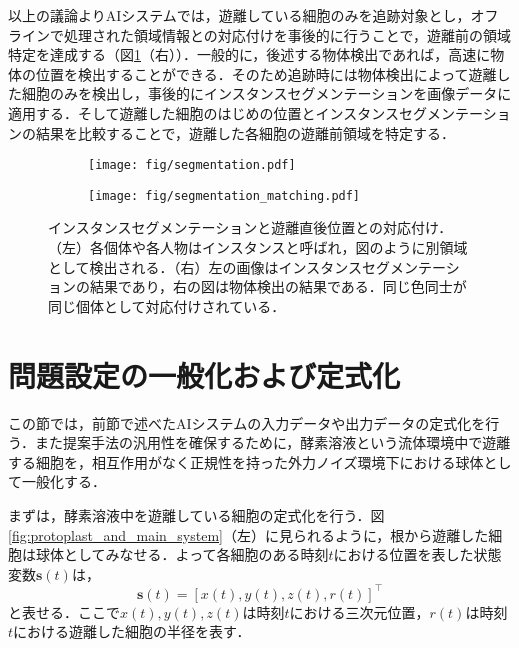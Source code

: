     以上の議論よりAIシステムでは，遊離している細胞のみを追跡対象とし，オフラインで処理された領域情報との対応付けを事後的に行うことで，遊離前の領域特定を達成する（図\ref{fig:instance_segmentation_and_matching}（右））．一般的に，後述する物体検出であれば，高速に物体の位置を検出することができる．そのため追跡時には物体検出によって遊離した細胞のみを検出し，事後的にインスタンスセグメンテーションを画像データに適用する．そして遊離した細胞のはじめの位置とインスタンスセグメンテーションの結果を比較することで，遊離した各細胞の遊離前領域を特定する．

    \begin{figure}[t]
        \centering
        \begin{subfigure}[b]{.45\linewidth}
            \centering
            \texttt{[image: fig/segmentation.pdf]}
        \end{subfigure}
        \hfill
        \begin{subfigure}[b]{.45\linewidth}
            \centering
            \texttt{[image: fig/segmentation\_matching.pdf]}
        \end{subfigure}
        \caption[インスタンスセグメンテーションと遊離直後位置との対応付け]{インスタンスセグメンテーションと遊離直後位置との対応付け．（左）各個体や各人物はインスタンスと呼ばれ，図のように別領域として検出される．（右）左の画像はインスタンスセグメンテーションの結果であり，右の図は物体検出の結果である．同じ色同士が同じ個体として対応付けされている．}
        \label{fig:instance_segmentation_and_matching}
    \end{figure}

\section{問題設定の一般化および定式化}
\label{sec:setting}

この節では，前節で述べたAIシステムの入力データや出力データの定式化を行う．また提案手法の汎用性を確保するために，酵素溶液という流体環境中で遊離する細胞を，相互作用がなく正規性を持った外力ノイズ環境下における球体として一般化する．

まずは，酵素溶液中を遊離している細胞の定式化を行う．図\ref{fig:protoplast_and_main_system}（左）に見られるように，根から遊離した細胞は球体としてみなせる．よって各細胞のある時刻$t$における位置を表した状態変数$\bm{s}(t)$は，
\begin{equation}
    \label{eq:continous_state_vecotr}
    \bm{s}(t) = \left[x(t), y(t), z(t), r(t)\right]^{\top}
\end{equation}
と表せる．ここで$x(t),y(t),z(t)$は時刻$t$における三次元位置，$r(t)$は時刻$t$における遊離した細胞の半径を表す．

